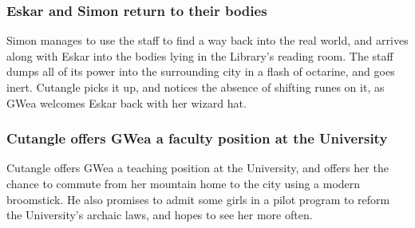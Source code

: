 \subsubsection{\Gls{Eskar} and \Gls{Simon} return to their bodies}
\Gls{Simon} manages to use the staff to find a way back into the real world, and arrives along with
\Gls{Eskar} into the bodies lying in the Library's reading room. The staff dumps all of its power
into the surrounding city in a flash of octarine, and goes inert. \Gls{Cutangle} picks it up, and
notices the absence of shifting runes on it, as \Gls{GWea} welcomes \Gls{Eskar} back with her
wizard hat.

\subsubsection{\Gls{Cutangle} offers \Gls{GWea} a faculty position at the University}
\Gls{Cutangle} offers \Gls{GWea} a teaching position at the University, and offers her the chance
to commute from her mountain home to the city using a modern broomstick. He also promises to admit
some girls in a pilot program to reform the University's archaic laws, and hopes to see her more
often.